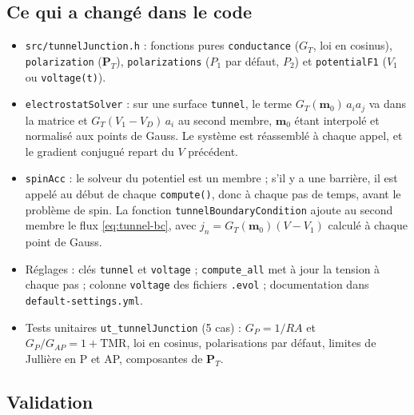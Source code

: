 \documentclass[11pt,a4paper]{article}
\newcommand{\vm}{\bm{m}}
\begin{document}
\subsection{Ce qui a changé dans le code}

\begin{itemize}
  \item \texttt{src/tunnelJunction.h} : fonctions pures
    \texttt{conductance} ($G_T$, loi en cosinus), \texttt{polarization}
    ($\bm{P}_T$), \texttt{polarizations} ($P_1$ par défaut, $P_2$) et
    \texttt{potentialF1} ($V_1$ ou \texttt{voltage(t)}).
  \item \texttt{electrostatSolver} : sur une surface \texttt{tunnel}, le
    terme $G_T(\vm_0)\,a_ia_j$ va dans la matrice et
    $G_T(V_1-V_D)\,a_i$ au second membre, $\vm_0$ étant interpolé et
    normalisé aux points de Gauss. Le système est réassemblé à chaque
    appel, et le gradient conjugué repart du $V$ précédent.
  \item \texttt{spinAcc} : le solveur du potentiel est un membre ; s'il y a
    une barrière, il est appelé au début de chaque \texttt{compute()},
    donc à chaque pas de temps, avant le problème de spin. La fonction
    \texttt{tunnelBoundaryCondition} ajoute au second membre le flux
    \eqref{eq:tunnel-bc}, avec $j_n = G_T(\vm_0)(V-V_1)$ calculé à chaque
    point de Gauss.
  \item Réglages : clés \texttt{tunnel} et \texttt{voltage} ;
    \texttt{compute\_all} met à jour la tension à chaque pas ; colonne
    \texttt{voltage} des fichiers \texttt{.evol} ; documentation dans
    \texttt{default-settings.yml}.
  \item Tests unitaires \texttt{ut\_tunnelJunction} (5 cas) : $G_P = 1/RA$
    et $G_P/G_{AP} = 1+\mathrm{TMR}$, loi en cosinus, polarisations par
    défaut, limites de Jullière en P et AP, composantes de $\bm{P}_T$.
\end{itemize}

\subsection{Validation}
\end{document}
